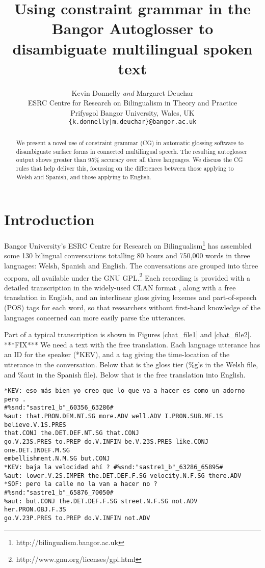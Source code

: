 \documentclass[11pt]{article}
\title{Using constraint grammar in the Bangor Autoglosser to disambiguate multilingual spoken text}
\author{Kevin Donnelly \textit{and} Margaret Deuchar\\
  ESRC Centre for Research on Bilingualism in Theory and Practice\\
  Prifysgol Bangor University, Wales, UK\\
  {\tt \{k.donnelly|m.deuchar\}@bangor.ac.uk}  }
\date{}
\begin{document}
\maketitle
\begin{abstract}
We present a novel use of constraint grammar (CG) in automatic glossing software to disambiguate surface forms in connected multilingual speech.  The resulting autoglosser output shows greater than 95\% accuracy over all three languages.  We discuss the CG rules that help deliver this, focussing on the differences between those applying to Welsh and Spanish, and those applying to English.
\end{abstract}

\section{Introduction}
\label{sec:intro}

Bangor University's ESRC Centre for Research on Bilingualism\footnote{http://bilingualism.bangor.ac.uk} has assembled some 130 bilingual conversations totalling 80 hours and 750,000 words in three languages: Welsh, Spanish and English.  The conversations are grouped into three corpora, all available under the GNU GPL.\footnote{http://www.gnu.org/licenses/gpl.html}  Each recording is provided with a detailed transcription in the widely-used CLAN format \cite{macwhinney2000}, along with a free translation in English, and an interlinear gloss giving lexemes and part-of-speech (POS) tags for each word, so that researchers without first-hand knowledge of the languages concerned can more easily parse the utterances.

Part of a typical transcription is shown in Figures \ref{chat_file1} and \ref{chat_file2}. ***FIX*** We need a text with the free translation.  Each language utterance has an ID for the speaker (*KEV), and a tag giving the time-location of the utterance in the conversation.  Below that is the gloss tier (\%gls in the Welsh file, and \%aut in the Spanish file).  Below that is the free translation into English.

\begin{figure*} 
\begin{footnotesize}
\begin{verbatim}
*KEV: eso más bien yo creo que lo que va a hacer es como un adorno pero . 
#%snd:"sastre1_b"_60356_63286#
%aut: that.PRON.DEM.NT.SG more.ADV well.ADV I.PRON.SUB.MF.1S believe.V.1S.PRES 
that.CONJ the.DET.DEF.NT.SG that.CONJ 
go.V.23S.PRES to.PREP do.V.INFIN be.V.23S.PRES like.CONJ one.DET.INDEF.M.SG 
embellishment.N.M.SG but.CONJ
*KEV: baja la velocidad ahí ? #%snd:"sastre1_b"_63286_65895#
%aut: lower.V.2S.IMPER the.DET.DEF.F.SG velocity.N.F.SG there.ADV
*SOF: pero la calle no la van a hacer no ? #%snd:"sastre1_b"_65876_70050#
%aut: but.CONJ the.DET.DEF.F.SG street.N.F.SG not.ADV her.PRON.OBJ.F.3S 
go.V.23P.PRES to.PREP do.V.INFIN not.ADV 
\end{verbatim}
\end{footnotesize}
\caption{Excerpt from a CHAT (.cha) file in the Miami corpus (Spanish-English)}
\label{chat_file1}
\end{figure*}
\end{document}
